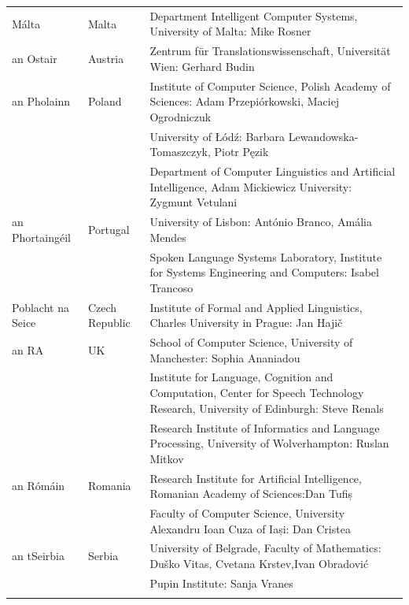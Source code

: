 \begin{longtable}{@{}llp{113mm}@{}}
  Málta & \textcolor{grey1}{Malta} & Department Intelligent Computer Systems, University of Malta: Mike Rosner\\ \addlinespace
  
  an Ostair & \textcolor{grey1}{Austria} & Zentrum für Translationswissenschaft, Universität Wien: Gerhard Budin\\ \addlinespace
   
  an Pholainn & \textcolor{grey1}{Poland} & Institute of Computer Science, Polish Academy of Sciences: Adam Przepiórkowski, Maciej Ogrodniczuk \\ \addlinespace
  & & University of Łódź: Barbara Lewandowska-Tomaszczyk, Piotr Pęzik\\ \addlinespace
  & & Department of Computer Linguistics and Artificial Intelligence, Adam Mickiewicz University: Zygmunt Vetulani \\ \addlinespace
  
  an Phortaingéil & \textcolor{grey1}{Portugal} & University of Lisbon: António Branco, Amália Mendes \\ \addlinespace
  & & Spoken Language Systems Laboratory, Institute for Systems Engineering and Computers: Isabel Trancoso \\ \addlinespace
  
  Poblacht na Seice & \textcolor{grey1}{Czech Republic} & Institute of Formal and Applied Linguistics, Charles University in Prague: Jan Hajič \\ \addlinespace
  
  an RA & \textcolor{grey1}{UK} &   School of Computer Science, University of Manchester: Sophia Ananiadou \\ \addlinespace 
  & & Institute for Language, Cognition and Computation, Center for Speech Technology Research, University of Edinburgh: Steve Renals \\ \addlinespace 
  & & Research Institute of Informatics and Language Processing, University of Wolverhampton: Ruslan Mitkov \\ \addlinespace
  
  an Rómáin & \textcolor{grey1}{Romania} & Research Institute for Artificial Intelligence, Romanian Academy of Sciences:\newline Dan Tufiș \\ \addlinespace
  & & Faculty of Computer Science, University Alexandru Ioan Cuza of Iași: Dan Cristea \\ \addlinespace
  
  an tSeirbia & \textcolor{grey1}{Serbia} & University of Belgrade, Faculty of Mathematics: Duško Vitas, Cvetana Krstev,\newline Ivan Obradović \\ \addlinespace
  & & Pupin Institute: Sanja Vranes \\ \addlinespace
    

\end{longtable}
